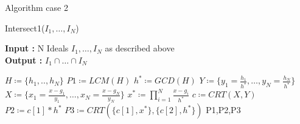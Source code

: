 \documentclass{beamer}
\begin{document}
\begin{frame}{Algorithm case 2}
    \begin{algorithm}[H]
    \caption{Intersect1($I_{1},\dots,I_{N}$)}\label{alg:intersect-n-ideals-equal-gcd}
    \textbf{Input : } N Ideals $I_{1},\dots,I_{N}$ as described above \\
    \textbf{Output : }$I_{1} \cap \dots\cap I_ {N}$
\begin{algorithmic}
    \State $H \coloneqq \{h_{1},..,h_{N}\}$
    \State $P1 \coloneqq LCM(H)$
    \State $h^{*} \coloneqq GCD(H)$
    \State $Y\coloneqq \{y_{1}= \frac{h_{1}}{h^{*}},\dots,y_{N}= \frac{h_{N}}{h^{*}}\}$
    \State $X \coloneqq \{x_{1} = \frac{x-g_{1}}{y_{1}},\dots,x_{N} =\frac{x-g_{N}}{y_{N}}\}$
    \State $x^{*} \coloneqq \prod^{N}_{i=1} \frac{x-g_{i}}{h^{*}}$
    \State $c\coloneqq CRT(X,Y)$
    \State $P2 \coloneqq c[1]*h^{*}$ 
    \State $P3 \coloneqq CRT(\{c[1],x^{*}\},\{c[2], h^{*}\})$
    \State \Return P1,P2,P3
\end{algorithmic}
\end{algorithm}
\end{frame}
\end{document}
